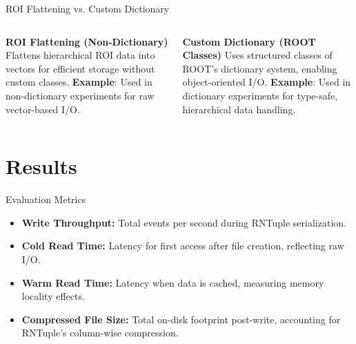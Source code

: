 \documentclass[aspectratio=169]{beamer}
\begin{document}
\begin{frame}{ROI Flattening vs. Custom Dictionary}
  \begin{columns}
    \textbf{ROI Flattening (Non-Dictionary)}
    \small Flattens hierarchical ROI data into vectors for efficient storage without custom classes.
    \vspace{0.5em}
    \vspace{0.5em}
    \textbf{Example}: Used in non-dictionary experiments for raw vector-based I/O.

    \textbf{Custom Dictionary (ROOT Classes)}
    \small Uses structured classes of ROOT's dictionary system, enabling object-oriented I/O.
    \vspace{0.5em}
    \vspace{0.5em}
    \textbf{Example}: Used in dictionary experiments for type-safe, hierarchical data handling.
  \end{columns}
  \vspace{1em}
\end{frame}


\section{Results}

\begin{frame}{Evaluation Metrics}
\small
\begin{itemize}
  \item \textbf{Write Throughput:} Total events per second during RNTuple serialization.
  \item \textbf{Cold Read Time:} Latency for first access after file creation, reflecting raw I/O.
  \item \textbf{Warm Read Time:} Latency when data is cached, measuring memory locality effects.
  \item \textbf{Compressed File Size:} Total on-disk footprint post-write, accounting for RNTuple's column-wise compression.
\end{itemize}
\end{frame}
\end{document}
